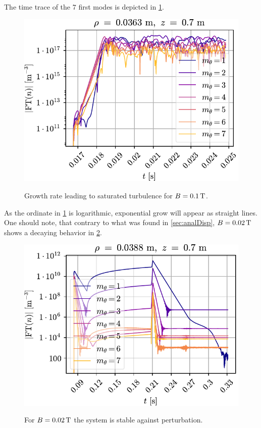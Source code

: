 The time trace of the $7$ first modes is depicted in \cref{fig:fourierUnstable}.
%
\begin{figure}[h!]
    \centering
    \includegraphics{fig/results/fourierModes/unstable}
    \label{fig:fourierUnstable}
    \caption{Growth rate leading to saturated turbulence for $B=0.1\, \text{T}$.}
\end{figure}
%
As the ordinate in \cref{fig:fourierUnstable} is logarithmic, exponential grow will appear as straight lines.
One should note, that contrary to what was found in \cref{sec:analDisp}, $B=0.02\, \text{T}$ shows a decaying behavior in \cref{fig:fourierStable}.
%
\begin{figure}[h!]
    \centering
    \includegraphics{fig/results/fourierModes/stable}
    \label{fig:fourierStable}
    \caption{For $B=0.02\, \text{T}$ the system is stable against perturbation.}
\end{figure}
